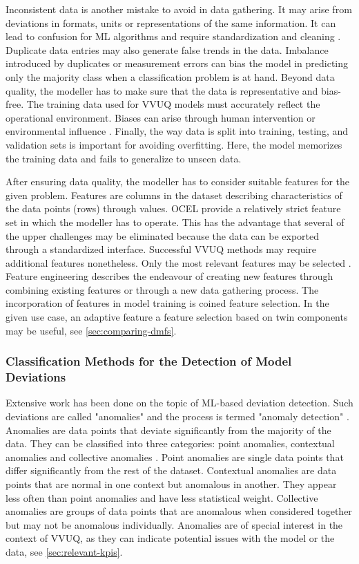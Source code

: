 Inconsistent data is another mistake to avoid in data gathering. It may arise from deviations in formats, units or representations of the same information. It can lead to confusion for ML algorithms and require standardization and cleaning \parencite{mahanthappa2021data}. Duplicate data entries may also generate false trends in the data. Imbalance introduced by duplicates or measurement errors can bias the model in predicting only the majority class when a classification problem is at hand.
Beyond data quality, the modeller has to make sure that the data is representative and bias-free. The training data used for VVUQ models must accurately reflect the operational environment. Biases can arise through human intervention or environmental influence \parencite{liu2020noise}. Finally, the way data is split into training, testing, and validation sets is important for avoiding overfitting. Here, the model memorizes the training data and fails to generalize to unseen data.

After ensuring data quality, the modeller has to consider suitable features for the given problem. Features are columns in the dataset describing characteristics of the data points (rows) through values. OCEL provide a relatively strict feature set in which the modeller has to operate. This has the advantage that several of the upper challenges may be eliminated because the data can be exported through a standardized interface. Successful VVUQ methods may require additional features nonetheless. Only the most relevant features may be selected \parencite{geron2022hands}. Feature engineering describes the endeavour of creating new features through combining existing features or through a new data gathering process. The incorporation of features in model training is coined feature selection. In the given use case, an adaptive feature a feature selection based on twin components may be useful, see \autoref{sec:comparing-dmfs}.

\subsubsection*{Classification Methods for the Detection of Model Deviations}
\label{sec:classification-methods}
Extensive work has been done on the topic of ML-based deviation detection. Such deviations are called "anomalies" and the process is termed "anomaly detection" \parencite{kharitonov2022comparative}. Anomalies are data points that deviate significantly from the majority of the data. They can be classified into three categories: point anomalies, contextual anomalies and collective anomalies \parencite{chandola2009anomaly}. Point anomalies are single data points that differ significantly from the rest of the dataset. Contextual anomalies are data points that are normal in one context but anomalous in another. They appear less often than point anomalies and have less statistical weight. Collective anomalies are groups of data points that are anomalous when considered together but may not be anomalous individually. Anomalies are of special interest in the context of VVUQ, as they can indicate potential issues with the model or the data, see \autoref{sec:relevant-kpis}.


